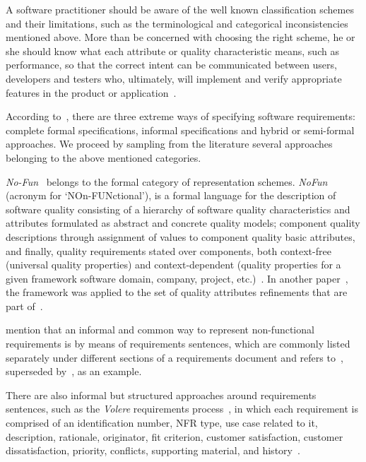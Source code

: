 \documentclass[dissertation,final]{softeng}
\begin{document}
A software practitioner should be aware of the well known classification schemes and their limitations, such as the terminological and categorical inconsistencies mentioned above. More than be concerned with choosing the right scheme, he or she should know what each attribute or quality characteristic means, such as performance, so that the correct intent can be communicated between users, developers and testers who, ultimately, will implement and verify appropriate features in the product or application~\citep{Chung:2009vg}.

According to~\citet{Matoussi:2008wr}, there are three extreme ways of specifying software requirements: complete formal specifications, informal specifications and hybrid or semi-formal approaches. We proceed by sampling from the literature several approaches belonging to the above mentioned categories.

\emph{No-Fun}~\citep{Franch1998} belongs to the formal category of representation schemes. \emph{NoFun} (acronym for `NOn-FUNctional'), is a formal language for the description of software quality consisting of a hierarchy of software quality characteristics and attributes formulated as abstract and concrete quality models; component quality descriptions through assignment of values to component quality basic attributes, and finally, quality requirements stated over components, both context-free (universal quality properties) and context-dependent (quality properties for a given framework software domain, company, project, etc.)~\citep{Franch1998}. In another paper~\citep{NoFunWithISO}, the framework was applied to the set of quality attributes refinements that are part of~\citet{ieee_std_9126One}.

\citet{Chung:2009vg} mention that an informal and common way to represent non-functional requirements is by means of requirements sentences, which are commonly listed separately under different sections of a requirements document and refers to~, superseded by~, as an example.

There are also informal but structured approaches around requirements sentences, such as the \emph{Volere} requirements process~\citep{Robertson:1999}, in which each requirement is comprised of an identification number, NFR type, use case related to it, description, rationale, originator, fit criterion, customer satisfaction, customer dissatisfaction, priority, conflicts, supporting material, and history~\citep{Chung:2009vg}.
\end{document}
